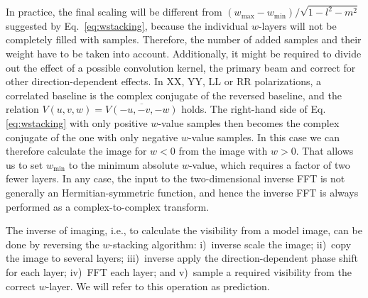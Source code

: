 \documentclass[useAMS,usenatbib]{mn2e}
\begin{document}
In practice, the final scaling will be different from $\left(w_{\max} - w_{\min}\right)/\sqrt{1-l^2-m^2}$ suggested by Eq.~\eqref{eq:wstacking}, because the individual $w$-layers will not be completely filled with samples. Therefore, the number of added samples and their weight have to be taken into account. Additionally, it might be required to divide out the effect of a possible convolution kernel, the primary beam and correct for other direction-dependent effects. In XX, YY, LL or RR polarizations, a correlated baseline is the complex conjugate of the reversed baseline, and the relation $V(u,v,w)=\overline{V(-u,-v,-w)}$ holds. The right-hand side of Eq.\eqref{eq:wstacking} with only positive $w$-value samples then becomes the complex conjugate of the one with only negative $w$-value samples. In this case we can therefore calculate the image for $w<0$ from the image with $w>0$. That allows us to set $w_{\min}$ to the minimum absolute $w$-value, which requires a factor of two fewer layers. In any case, the input to the two-dimensional inverse FFT is not generally an Hermitian-symmetric function, and hence the inverse FFT is always performed as a complex-to-complex transform. 

The inverse of imaging, i.e., to calculate the visibility from a model image, can be done by reversing the $w$-stacking algorithm: i)~inverse scale the image; ii)~copy the image to several layers; iii)~inverse apply the direction-dependent phase shift for each layer; iv)~FFT each layer; and v)~sample a required visibility from the correct $w$-layer. We will refer to this operation as prediction.
\end{document}
